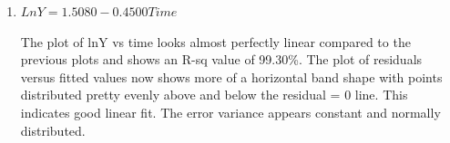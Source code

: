 \documentclass{article}
\providecommand{\tightlist}{%
      \setlength{\itemsep}{0pt}\setlength{\parskip}{0pt}}
\begin{document}
\begin{enumerate}
\def\labelenumi{\alph{enumi})}
\setcounter{enumi}{4}
\tightlist
\item
  \(LnY = 1.5080 - 0.4500 Time\)
  
\begin{figure}[!h]
  \begin{floatrow}
  \end{floatrow}
\end{figure}
  
The plot of lnY vs time looks almost perfectly linear compared to the
previous plots and shows an R-sq value of 99.30\%. The plot of residuals
versus fitted values now shows more of a horizontal band shape with
points distributed pretty evenly above and below the residual = 0 line.
This indicates good linear fit. The error variance appears constant and
normally distributed.
\end{enumerate}
\end{document}
